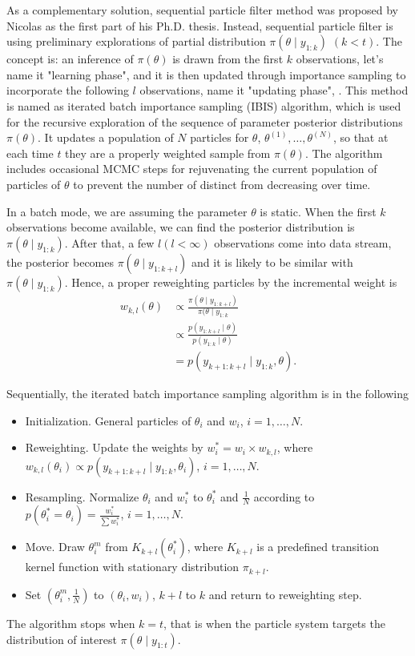 As a complementary solution, sequential particle filter method was proposed by Nicolas \cite{chopin2002sequential} as the first part of his Ph.D. thesis. Instead, sequential particle filter is using preliminary explorations of partial distribution $\pi(\theta\mid y_{1:k})$ $(k<t)$. The concept is: an inference of $\pi(\theta)$ is drawn from the first $k$ observations, let's name it "learning phase", and it is then updated through importance sampling to incorporate the following $l$ observations, name it "updating phase", \cite{chopin2002sequential}.  This method is named as iterated batch importance sampling (IBIS) algorithm, which is used for the recursive exploration of the sequence of parameter posterior distributions $\pi(\theta)$. It updates a population of $N$ particles for $\theta$, $\theta^{(1)}, \dots, \theta^{(N)}$, so that at each time $t$ they are a properly weighted sample from $\pi(\theta)$. The algorithm includes occasional MCMC steps for rejuvenating the current population of particles of $\theta$  to prevent the number of distinct from decreasing over time. 

In a batch mode, we are assuming the parameter $\theta$ is static. When the first $k$ observations become available, we can find the posterior distribution is $\pi(\theta\mid y_{1:k})$. After that, a few $l (l<\infty)$ observations come into data stream, the posterior becomes $\pi(\theta\mid y_{1:k+l})$ and it is likely to be similar with $\pi(\theta\mid y_{1:k})$.  Hence, a proper reweighting particles by the incremental weight is 
\begin{align*}
w_{k,l}(\theta) &\propto \frac{\pi(\theta\mid y_{1:k+l}) }{\pi(\theta\mid y_{1:k}} \\
&\propto \frac{p(y_{1:k+l}\mid \theta) }{p(y_{1:k}\mid\theta)} \\
&=p(y_{k+1:k+l}\mid y_{1:k},\theta). 
\end{align*}

Sequentially, the iterated batch importance sampling algorithm is in the following 
\begin{itemize}
\item Initialization. General particles of $\theta_i$ and $w_i$, $i=1,\dots,N$. 
\item Reweighting. Update the weights by $w_i^*=w_i \times w_{k,l}$, where $w_{k,l}(\theta_i)\propto p(y_{k+1:k+l}\mid y_{1:k},\theta_i)$, $i=1,\dots,N$. 
\item Resampling. Normalize $\theta_i$ and $w^*_i$ to $\theta_i^*$ and $\frac{1}{N}$ according to $p(\theta_i^*=\theta_i)=\frac{w_i^*}{\sum w_i^*}$,  $i=1,\dots,N$. 
\item Move. Draw $\theta_i^m$ from $K_{k+l}(\theta_i^*)$, where $K_{k+l}$ is a predefined transition kernel function with stationary distribution $\pi_{k+l}$.
\item Set $(\theta_i^m,\frac{1}{N})$ to $(\theta_i,w_i)$, $k+l$ to $k$ and return to reweighting step. 
\end{itemize}
The algorithm stops when $k=t$, that is when the particle system targets the distribution of interest $\pi(\theta\mid y_{1:t})$. 


